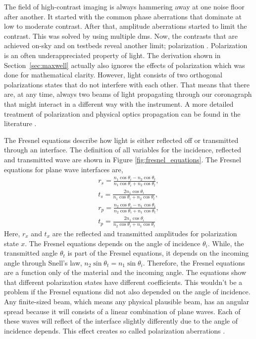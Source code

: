 \documentclass[letterpaper]{ar-1col}
\newcommand{\notebooksuggestion}[1]{\textcolor{blue}{[Notebook: #1]}}
\begin{document}

The field of high-contrast imaging is always hammering away at one noise floor after another. It started with the common phase aberrations that dominate at low to moderate contrast. After that, amplitude aberrations started to limit the contrast. This was solved by using multiple \acp{dm}. Now, the contrasts that are achieved on-sky and on testbeds reveal another limit; polarization \citep{Schmid18,millar2022polarization,vanHolstein23, baudoz2024polarization}. Polarization is an often underappreciated property of light. The derivation shown in Section~\ref{sec:maxwell} actually also ignores the effects of polarization which was done for mathematical clarity. However, light consists of two orthogonal polarizations states that do not interfere with each other. That means that there are, at any time, always two beams of light propagating through our coronagraph that might interact in a different way with the instrument. A more detailed treatment of polarization and physical optics propagation can be found in the literature \citep{McLeod14}.

The Fresnel equations describe how light is either reflected off or transmitted through an interface. The definition of all variables for the incidence, reflected and transmitted wave are shown in Figure \ref{fig:fresnel_equations}. The Fresnel equations for plane wave interfaces are,
\begin{align}
r_s = \frac{n_1\cos{\theta_i} - n_2\cos{\theta_t}}{n_1\cos{\theta_i} + n_2\cos{\theta_t}},\\
t_s = \frac{2n_1 \cos{\theta_i}}{n_1\cos{\theta_i} + n_2\cos{\theta_t}},\\
r_p = \frac{n_2\cos{\theta_i} - n_1\cos{\theta_t}}{n_2\cos{\theta_i} + n_1\cos{\theta_t}},\\
t_p = \frac{2n_1 \cos{\theta_i}}{n_2\cos{\theta_i} + n_1\cos{\theta_t}}
\end{align}
Here, $r_x$ and $t_x$ are the reflected and transmitted amplitudes for polarization state $x$. The Fresnel equations depends on the angle of incidence $\theta_i$. While, the transmitted angle $\theta_t$ is part of the Fresnel equations, it depends on the incoming angle through Snell's law, $n_2 \sin \theta_t = n_1 \sin \theta_i$. Therefore, the Fresnel equations are a function only of the material and the incoming angle. The equations show that different polarization states have different coefficients. This wouldn't be a problem if the Fresnel equations did not also depended on the angle of incidence. Any finite-sized beam, which means any physical plausible beam, has an angular spread because it will consists of a linear combination of plane waves. Each of these waves will reflect of the interface slightly differently due to the angle of incidence depends. This effect creates so called polarization aberrations \citep{Chipman89, Breckinridge15}.
\end{document}
